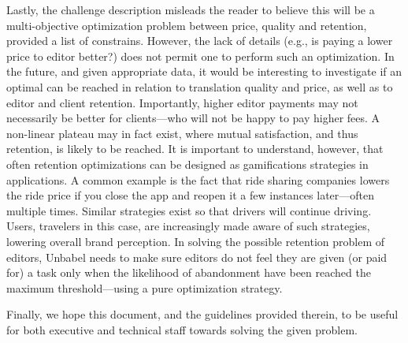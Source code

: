 \documentclass[10pt, a4paper]{article}
\begin{document}
Lastly, the challenge description misleads the reader to believe this will be a multi-objective optimization problem between price, quality and retention, provided a list of constrains. However, the lack of details (e.g., is paying a lower price to editor better?) does not permit one to perform such an optimization.
%
In the future, and given appropriate data, it would be interesting to investigate if an optimal can be reached in relation to translation quality and price, as well as to editor and client retention. Importantly, higher editor payments may not necessarily be better for clients---who will not be happy to pay higher fees. A non-linear plateau may in fact exist, where mutual satisfaction, and thus retention, is likely to be reached.
%
It is important to understand, however, that often retention optimizations can be designed as gamifications strategies in applications. A common example is the fact that ride sharing companies lowers the ride price if you close the app and reopen it a few instances later---often multiple times. Similar strategies exist so that drivers will continue driving. Users, travelers in this case, are increasingly made aware of such strategies, lowering overall brand perception.
%
In solving the possible retention problem of editors, Unbabel needs to make sure editors do not feel they are given (or paid for) a task only when the likelihood of abandonment have been reached the maximum threshold---using a pure optimization strategy. 


Finally, we hope this document, and the guidelines provided therein, to be useful for both executive and technical staff towards solving the given problem.
\end{document}
